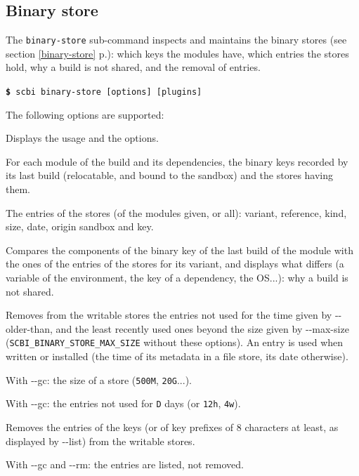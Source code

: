 \documentclass[a4paper,12pt,twoside]{article}
\newcommand{\code}[1]{\texttt{#1}}
\newcommand{\seeref}[1]{see section \ref{#1} p.\pageref{#1}}
\newcommand{\cmd}[1]{\tabto{1cm}\hspace{0.5cm}\texttt{\textbf{\$} #1}}
\newcommand{\ddash}{-{}-}
\begin{document}
\subsection{Binary store}
\label{binary-store-tool}

The \code{binary-store} sub-command inspects and maintains the binary stores (\seeref{binary-store}): which keys the modules have, which entries the stores hold, why a build is not shared, and the removal of entries.

\cmd{scbi binary-store [options] [plugins]}

The following options are supported:

\begin{description}[font=\texttt]
	\item[-h | \ddash{}help] Displays the usage and the options.

	\item[\ddash{}show-key {[}modules{]}] For each module of the build and its dependencies, the binary keys recorded by its last build (relocatable, and bound to the sandbox) and the stores having them.

	\item[\ddash{}list {[}modules{]}] The entries of the stores (of the modules given, or all): variant, reference, kind, size, date, origin sandbox and key.

	\item[\ddash{}explain <module>] Compares the components of the binary key of the last build of the module with the ones of the entries of the stores for its variant, and displays what differs (a variable of the environment, the key of a dependency, the OS...): why a build is not shared.

	\item[\ddash{}gc] Removes from the writable stores the entries not used for the time given by \ddash{}older-than, and the least recently used ones beyond the size given by \ddash{}max-size (\code{SCBI\_BINARY\_STORE\_MAX\_SIZE} without these options). An entry is used when written or installed (the time of its metadata in a file store, its date otherwise).

	\item[\ddash{}max-size=<S>] With \ddash{}gc: the size of a store (\code{500M}, \code{20G}...).

	\item[\ddash{}older-than=<D>] With \ddash{}gc: the entries not used for \code{D} days (or \code{12h}, \code{4w}).

	\item[\ddash{}rm <key>...] Removes the entries of the keys (or of key prefixes of 8 characters at least, as displayed by \ddash{}list) from the writable stores.

	\item[\ddash{}dry-run] With \ddash{}gc and \ddash{}rm: the entries are listed, not removed.
\end{description}
\end{document}
